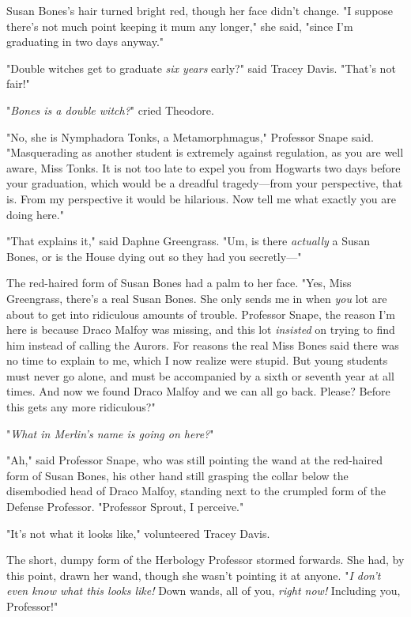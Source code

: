 Susan Bones's hair turned bright red, though her face didn't change. "I suppose
there's not much point keeping it mum any longer," she said, "since I'm
graduating in two days anyway."

"Double witches get to graduate \emph{six years} early?" said Tracey Davis.
"That's not fair!"

"\emph{Bones is a double witch?}" cried Theodore.

"No, she is Nymphadora Tonks, a Metamorphmagus," Professor Snape said.
"Masquerading as another student is extremely against regulation, as you are
well aware, Miss Tonks. It is not too late to expel you from Hogwarts two days
before your graduation, which would be a dreadful tragedy—from your
perspective, that is. From my perspective it would be hilarious. Now tell me
what exactly you are doing here."

"That explains it," said Daphne Greengrass. "Um, is there \emph{actually} a
Susan Bones, or is the House dying out so they had you secretly—"

The red-haired form of Susan Bones had a palm to her face. "Yes, Miss
Greengrass, there's a real Susan Bones. She only sends me in when \emph{you}
lot are about to get into ridiculous amounts of trouble. Professor Snape, the
reason I'm here is because Draco Malfoy was missing, and this lot
\emph{insisted} on trying to find him instead of calling the Aurors. For
reasons the real Miss Bones said there was no time to explain to me, which I
now realize were stupid. But young students must never go alone, and must be
accompanied by a sixth or seventh year at all times. And now we found Draco
Malfoy and we can all go back. Please? Before this gets any more ridiculous?"

"\emph{What in Merlin's name is going on here?}"

"Ah," said Professor Snape, who was still pointing the wand at the red-haired
form of Susan Bones, his other hand still grasping the collar below the
disembodied head of Draco Malfoy, standing next to the crumpled form of the
Defense Professor. "Professor Sprout, I perceive."

"It's not what it looks like," volunteered Tracey Davis.

The short, dumpy form of the Herbology Professor stormed forwards. She had, by
this point, drawn her wand, though she wasn't pointing it at anyone. "\emph{I
don't even know what this looks like!} Down wands, all of you, \emph{right
now!} Including you, Professor!"

